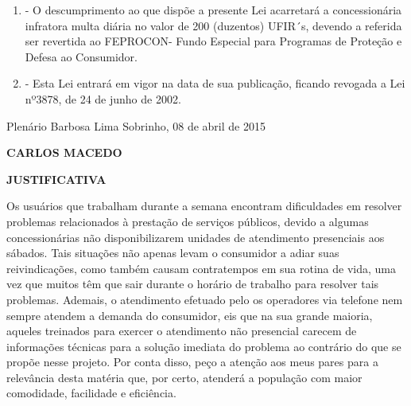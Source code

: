 \documentclass[10pt]{article}
\begin{document}
\begin{enumerate}[label=Art. \arabic*\textdegree]
\item - O descumprimento ao que dispõe a presente Lei acarretará a concessionária infratora multa diária no valor de 200 (duzentos) UFIR´s, devendo a referida ser revertida ao FEPROCON- Fundo Especial para Programas de Proteção e Defesa ao Consumidor.

\item - Esta Lei entrará em vigor na data de sua publicação, ficando revogada a Lei nº3878, de 24 de junho de 2002.
       

\end{enumerate}




\begin{center}
  Plenário Barbosa Lima Sobrinho, 08 de abril de 2015

   \bigskip

  \textbf{ CARLOS MACEDO}

  \bigskip

  \textbf{JUSTIFICATIVA}
  \bigskip

\end{center}

  Os usuários que trabalham durante a semana encontram dificuldades em resolver problemas relacionados à prestação de serviços públicos, devido a algumas concessionárias não disponibilizarem unidades de atendimento presenciais aos sábados.
Tais situações não apenas levam o consumidor a adiar suas reivindicações, como também causam contratempos em sua rotina de vida, uma vez que muitos têm que sair durante o horário de trabalho para resolver tais problemas. Ademais, o atendimento efetuado pelo os operadores via telefone nem sempre atendem a demanda do consumidor, eis que na sua grande maioria, aqueles treinados para exercer o atendimento não presencial carecem de informações técnicas para a solução imediata do problema ao contrário do que se propõe nesse projeto.
Por conta disso, peço a atenção aos meus pares para a relevância desta matéria que, por certo, atenderá a população com maior comodidade, facilidade e eficiência.



\iffalse
\begin{center}
  \textbf{REFERÊNCIAS}
\end{center}


\fi
\end{document}
